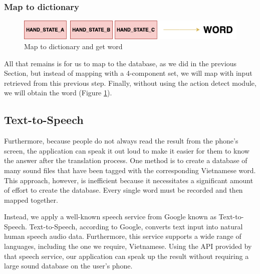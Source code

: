 
      
      
    \subsubsection{ Map to dictionary }

      \begin{figure}[H]
        \centering
        \includegraphics[width=\textwidth]{img/Chap4/Result.png}
        \caption{ Map to dictionary and get word }
        \label{fig:Chap4-Result}
      \end{figure}


All that remains is for us to map to the database, as we did in the previous Section, but instead of mapping with a 4-component set, we will map with input retrieved from this previous step. Finally, without using the action detect module, we will obtain the word (Figure \ref{fig:Chap4-Result}).

\subsection{Text-to-Speech}

Furthermore, because people do not always read the result from the phone's screen, the application can speak it out loud to make it easier for them to know the answer after the translation process. One method is to create a database of many sound files that have been tagged with the corresponding Vietnamese word. This approach, however, is inefficient because it necessitates a significant amount of effort to create the database. Every single word must be recorded and then mapped together.

Instead, we apply a well-known speech service from Google known as Text-to-Speech\cite{GG:Text-to-Speech}. Text-to-Speech, according to Google, converts text input into natural human speech audio data. Furthermore, this service supports a wide range of languages, including the one we require, Vietnamese. Using the API provided by that speech service, our application can speak up the result without requiring a large sound database on the user's phone.

